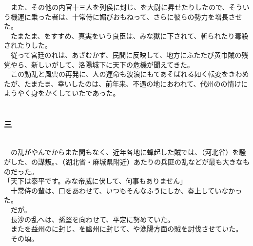 \documentclass[
  paper=a5,
  fontsize=10pt,
  jafontsize=9.5pt,
  tate,                  %
  open_bracket_pos=nibu, %
]{jlreq}
\begin{document}
　また、その他の内官十三人を列侯に封じ、を大尉に昇せたりしたので、そういう機運に乗った者は、十常侍に媚びおもねって、さらに彼らの勢力を増長させた。\\


　たまたま、をすすめ、真実をいう良臣は、みな獄に下されて、斬られたり毒殺されたりした。\\


　従って宮廷のれは、あざむかず、民間に反映して、地方にふたたび黄巾賊の残党やら、新しいがして、洛陽城下に天下の危機が聞えてきた。\\


　この動乱と風雲の再発に、人の運命も波浪にもてあそばれる如く転変をきわめたが、たまたま、幸いしたのは、前年来、不遇の地におわれて、代州のの情けにようやく身をかくしていたであった。\\

\\

\subsubsection{三}

\\


　の乱がやんでからまた間もなく、近年各地に蜂起した賊では、（河北省）を騒がした、の謀叛。、（湖北省・麻城県附近）あたりの兵匪の乱などが最も大きなものだった。\\


「天下は泰平です。みな帝威に伏して、何事もありません」\\


　十常侍の輩は、口をあわせて、いつもそんなふうにしか、奏上していなかった。\\


　だが。\\


　長沙の乱へは、孫堅を向わせて、平定に努めていた。\\


　またを益州のに封じ、を幽州に封じて、や漁陽方面の賊を討伐させていた。\\


　その頃。\\
\end{document}

